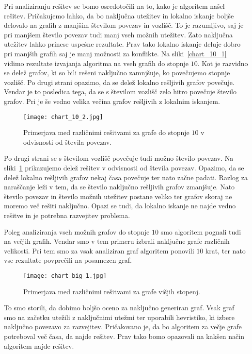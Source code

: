 \documentclass[12pt,a4paper,twoside]{article}
\theoremstyle{definition} %
\theoremstyle{plain} %
\numberwithin{equation}{section}  %
\begin{document}
Pri analiziranju rešitev se bomo osredotočili na to, kako je algoritem našel rešitev. Pričakujemo lahko, da bo naključna utežitev in lokalno iskanje boljše delovalo na grafih z manjšim številom povezav in vozlišč. To je razumljivo, saj je pri manjšem število povezav tudi manj vseh možnih utežitev. Zato naključna utežitev lahko prinese uspešne rezultate. Prav tako lokalno iskanje deluje dobro pri manjših grafih saj je manj možnosti za konflikte. Na sliki~\ref{chart_10_1} vidimo rezultate izvajanja algoritma na vseh grafih do stopnje $10$. Kot je razvidno se delež grafov, ki so bili rešeni naključno zamnjšuje, ko povečujemo stopnje vozlišč. Po drugi strani opazimo, da se delež lokalno rešljivih grafov povečuje. Vendar je to posledica tega, da se s številom vozlišč zelo hitro povečuje število grafov. Pri je še vedno velika večina grafov rešljivih z lokalnim iskanjem.
 \begin{figure}[h!]
\caption{Primerjava med različnimi rešitvami za grafe do stopnje $10$ v odvisnosti od števila povezav.}
\label{chart_10_2}
\centering
    \texttt{[image: chart\_10\_2.jpg]}
    \end{figure}
Po drugi strani se s številom vozlišč povečuje tudi možno število povezav. Na sliki~\ref{chart_10_2} prikazujemo delež rešitev v odvisnosti od števila povezav. Opazimo, da se delež lokalno rešljivih grafov nekaj časa povečuje ter nato začne padati. Razlog za naraščanje leži v tem, da se število naključno rešljivih grafov zmanjšuje. Nato število povezav in število možnih utežitev postane veliko ter grafov skoraj ne moremo več rešiti naključno. Opazi se tudi, da lokalno iskanje ne najde vedno rešitve in je potrebna razvejitev problema.

Poleg analiziranja vseh možnih grafov do stopnje $10$ smo algoritem pognali tudi na večjih grafih. Vendar smo v tem primeru izbrali naključne grafe različnih velikosti. Pri tem smo za vsak analiziran graf algoritem ponovili $10$ krat, ter nato vse rezultate povprečili na posamezen graf.
 \begin{figure}[h!]
\caption{Primerjava med različnimi rešitvami za grafe višjih stopenj.}
\label{chart_big_1}
\centering
    \texttt{[image: chart\_big\_1.jpg]}
    \end{figure}
To smo storili, da dobimo boljšo oceno za naključno generiran graf. Vsak graf smo na začetku utežili z naključnimi utežmi ter uporabili hevristiko, ki izbere naključno povezavo za razvejitev. Pričakovano je, da bo algoritem za večje grafe potreboval več časa, da najde rešitev. Prav tako bomo opazovali na kakšen način algoritem najde rešitev. 
\end{document}
